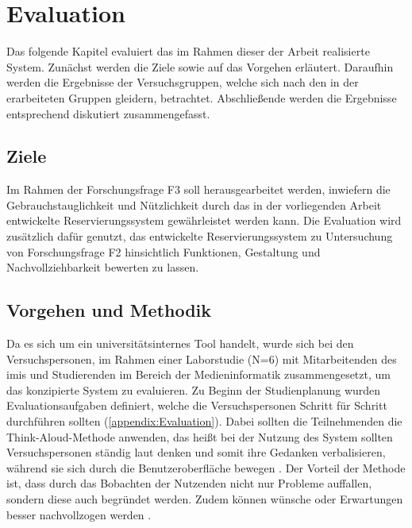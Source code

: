 

\chapter{Evaluation}
\label{chapter-evaluation}
Das folgende Kapitel evaluiert das im Rahmen dieser der Arbeit realisierte System. Zunächst werden
die Ziele sowie auf das Vorgehen erläutert. Daraufhin werden die Ergebnisse der Versuchsgruppen,
welche sich nach den in der  erarbeiteten Gruppen gleidern, betrachtet.
Abschließende werden die Ergebnisse entsprechend diskutiert zusammengefasst.

\section{Ziele}
Im Rahmen der Forschungsfrage F3 soll herausgearbeitet werden, inwiefern die Gebrauchstauglichkeit
und Nützlichkeit durch das in der vorliegenden Arbeit entwickelte Reservierungssystem gewährleistet
werden kann. Die Evaluation wird zusätzlich dafür genutzt, das entwickelte Reservierungssystem zu
Untersuchung von Forschungsfrage F2 hinsichtlich Funktionen, Gestaltung und Nachvollziehbarkeit
bewerten zu lassen.


\section{Vorgehen und Methodik}
Da es sich um ein universitätsinternes Tool handelt, wurde sich bei den Versuchspersonen, im Rahmen
einer Laborstudie (N=6) mit Mitarbeitenden des \ac{imis} und Studierenden im Bereich der
Medieninformatik zusammengesetzt, um das konzipierte System zu evaluieren. Zu Beginn der
Studienplanung wurden Evaluationsaufgaben definiert, welche die Versuchspersonen Schritt für Schritt
durchführen sollten (\ref{appendix:Evaluation}). Dabei sollten die Teilnehmenden die
Think-Aloud-Methode anwenden, das heißt bei der Nutzung des System sollten Versuchspersonen ständig
laut denken und somit ihre Gedanken verbalisieren, während sie sich durch die Benutzeroberfläche
bewegen \cite{nielsen_usability_1994}. Der Vorteil der Methode ist, dass durch das Bobachten der
Nutzenden nicht nur Probleme auffallen, sondern diese auch begründet werden. Zudem können wünsche
oder Erwartungen besser nachvollzogen werden \cite{nielsen_think}.

